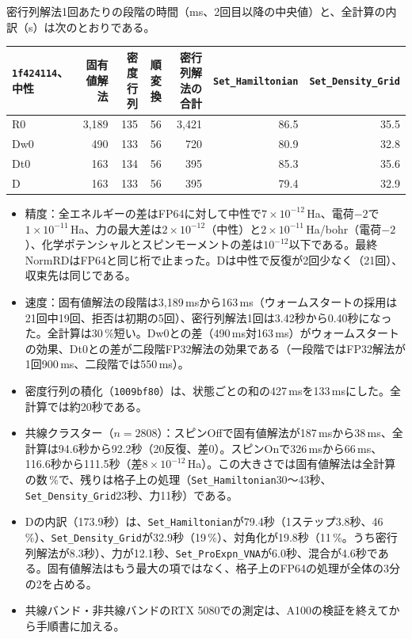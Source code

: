 \documentclass[a4paper,11pt]{ltjsarticle}
\newcommand{\code}[1]{\texttt{#1}}
\newcommand{\E}[1]{\times10^{#1}}
\begin{document}
\medskip
密行列解法1回あたりの段階の時間（ms、2回目以降の中央値）と、全計算の内訳（s）は次のとおりである。

\noindent\begin{tabularx}{\linewidth}{@{}Yrrrrrr@{}}
\toprule
\code{1f424114}、中性 & 固有値解法 & 密度行列 & 順変換 & 密行列解法の合計 & \code{Set\_Hamiltonian} & \code{Set\_Density\_Grid}\\
\midrule
R0 & 3,189 & 135 & 56 & 3,421 & 86.5 & 35.5\\
Dw0 & 490 & 133 & 56 & 720 & 80.9 & 32.8\\
Dt0 & 163 & 134 & 56 & 395 & 85.3 & 35.6\\
D & 163 & 133 & 56 & 395 & 79.4 & 32.9\\
\bottomrule
\end{tabularx}

\medskip
\begin{itemize}
\item 精度：全エネルギーの差はFP64に対して中性で$7\E{-12}$\,Ha、電荷$-2$で$1\E{-11}$\,Ha、力の最大差は$2\E{-12}$（中性）と$2\E{-11}$\,Ha/bohr（電荷$-2$）、化学ポテンシャルとスピンモーメントの差は$10^{-12}$以下である。最終NormRDはFP64と同じ桁で止まった。Dは中性で反復が2回少なく（21回）、収束先は同じである。
\item 速度：固有値解法の段階は3,189\,msから163\,ms（ウォームスタートの採用は21回中19回、拒否は初期の5回）、密行列解法1回は3.42秒から0.40秒になった。全計算は30\,\%短い。Dw0との差（490\,ms対163\,ms）がウォームスタートの効果、Dt0との差が二段階FP32解法の効果である（一段階ではFP32解法が1回900\,ms、二段階では550\,ms）。
\item 密度行列の積化（\code{1009bf80}）は、状態ごとの和の427\,msを133\,msにした。全計算では約20秒である。
\item 共線クラスター（$n=2808$）：スピンOffで固有値解法が187\,msから38\,ms、全計算は94.6秒から92.2秒（20反復、差$0$）。スピンOnで326\,msから66\,ms、116.6秒から111.5秒（差$8\E{-12}$\,Ha）。この大きさでは固有値解法は全計算の数\,\%で、残りは格子上の処理（\code{Set\_Hamiltonian}30〜43秒、\code{Set\_Density\_Grid}23秒、力11秒）である。
\item Dの内訳（173.9秒）は、\code{Set\_Hamiltonian}が79.4秒（1ステップ3.8秒、46\,\%）、\code{Set\_Density\_Grid}が32.9秒（19\,\%）、対角化が19.8秒（11\,\%。うち密行列解法が8.3秒）、力が12.1秒、\code{Set\_ProExpn\_VNA}が6.0秒、混合が4.6秒である。固有値解法はもう最大の項ではなく、格子上のFP64の処理が全体の3分の2を占める。
\item 共線バンド・非共線バンドのRTX 5080での測定は、A100の検証を終えてから手順書に加える。
\end{itemize}
\end{document}
